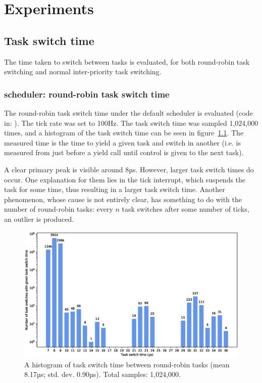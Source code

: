 

\chapter{Experiments}
\section{Task switch time}
The time taken to switch between tasks is evaluated, for both round-robin task switching and normal inter-priority task switching.

\subsection{\ucosiii scheduler: round-robin task switch time}
The round-robin task switch time under the default \ucosiii scheduler is evaluated (code in: ). The tick rate was set to 100Hz. The task switch time was sampled 1,024,000 times, and a histogram of the task switch time can be seen in figure~\ref{fig:rrhist}. The measured time is the time to yield a given task and switch in another (i.e. is measured from just before a yield call until control is given to the next task).

A clear primary peak is visible around 8µs. However, larger task switch times do occur. One explanation for them lies in the tick interrupt, which suspends the task for some time, thus resulting in a larger task switch time. Another phenomenon, whose cause is not entirely clear, has something to do with the number of round-robin tasks:  every $n$ task switches after some number of ticks, an outlier is produced.

\begin{figure}[htpb]
    \centering
    \includegraphics[width=\textwidth]{figures/task_switch_time.eps}
    \caption{A histogram of task switch time between round-robin tasks (mean 8.17µs; std. dev. 0.90µs). Total samples: 1,024,000.}
    \label{fig:rrhist}
\end{figure}

